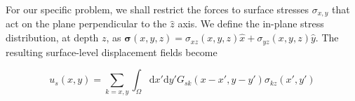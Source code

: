 \documentclass[aps,prl,reprint,twocolumn,groupedaddress,showpacs]{revtex4}
\def\dd{\mbox{d}}
\def\r{{\bf r}}
\def\u{{\bf u}}
\def\F{{\bf F}}
\def\F{{\bf F}}
\newcommand{\bs}{\boldsymbol{\sigma}}
\begin{document}
%
%
%
% 
% 
%
For our specific problem, we shall restrict the forces to surface
stresses $\sigma_{x,y}$ that act on the plane perpendicular to the
$\hat{z}$ axis. We define the in-plane stress distribution, at depth $z$, as
$\bs(x,y,z) = \sigma_{xz}(x,y,z)\hat{x} + \sigma_{yz}(x,y,z)\hat{y}$. 
The resulting surface-level displacement fields become

\begin{equation}
u_{s}(x,y) = \sum_{k=x,y}\int_\Omega \dd x'\dd y'G_{sk}(x-x',y-y')\sigma_{kz}(x',y') 
\label{eq:UMODEL1s}
\end{equation}
\end{document}
